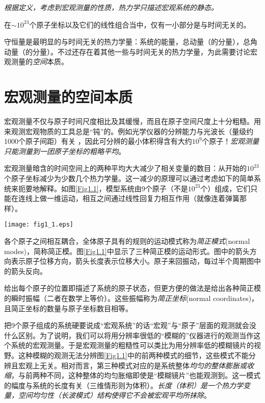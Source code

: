 {\it 根据定义，考虑到宏观测量的性质，热力学只描述宏观系统的静态。}

在$\sim 10^{23}$个原子坐标以及它们的线性组合当中，仅有一小部分是与时间无关的。

守恒量是最明显的与时间无关的热力学量：系统的能量，总动量（的分量），总角动量（的分量）。不过还存在着其他一些与时间无关的热力学量，为此需要讨论宏观测量的{\it 空间}本质。

\section{宏观测量的空间本质}
\label{sec1.2}
宏观测量不仅与原子时间尺度相比及其缓慢，而且在原子空间尺度上十分粗糙。用来观测宏观物质的工具总是“钝”的。例如光学仪器的分辨能力与光波长（量级约1000个原子间距）有关%
%
，因此可分辨的最小体积得含有大约$10^9$个原子！{\it 宏观测量只能测量到一团原子坐标的粗略平均}。

宏观测量暗含的时间空间上的两种平均大大减少了相关变量的数目：从开始的$10^{23}$个原子坐标减少为少数几个热力学量。这一减少的原理可以通过考虑如下的简单系统来扼要地解释。如图\ref{Fig1.1}，模型系统由9个原子（不是$10^{23}$个）组成，它们只能在连线上做一维运动，相互之间通过线性回复力相互作用（就像连着弹簧那样）。

{
	\centering
	\texttt{[image: fig1\_1.eps]} 
	\label{Fig1.1}
}

各个原子之间相互耦合，全体原子具有的规则的运动模式称为{\it 简正模式}(normal modes)，简称简正模。图\ref{Fig1.1}中显示了三种简正模的运动形式。图中的箭头方向表示原子位移方向，箭头长度表示位移大小。原子来回振动，每过半个周期图中的箭头反向。

给出每个原子的位置即描述了系统的原子状态，但更方便的做法是给出各种简正模的瞬时振幅（二者在数学上等价）。这些振幅称为{\it 简正坐标}(normal coordinates)，且简正坐标的数量与原子坐标数目相等。

把9个原子组成的系统硬要说成“宏观系统”的话“宏观”与“原子”层面的观测就会没什么区别。为了说明，我们可以将用分辨率很低的“模糊的”仪器进行的观测当作这个系统的宏观测量。于是宏观测量的粗糙性可以类比为用分辨率低的模糊镜片的视野。这种模糊的观测无法分辨图\ref{Fig1.1}中的前两种模式的细节，这些模式不能分辨且宏观上无关。相对而言，第三种模式对应的是系统整体{\it 均匀的整体膨胀或收缩}，与前两种不同，这种整体的均匀胀缩即使是“模糊镜片”也能观测到。这一模式的幅度与系统的长度有关（三维情形则为体积）。{\it 长度（体积）是一个热力学变量，空间均匀性（长波模式）结构使得它不会被宏观平均所抹除}。

